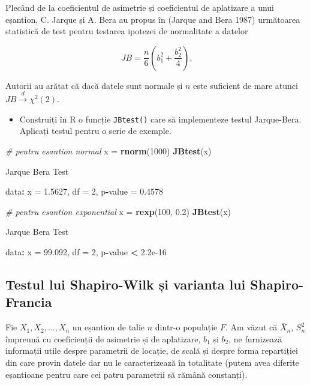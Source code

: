 \documentclass[]{article}
\newenvironment{Shaded}{\begin{snugshade}}{\end{snugshade}}
\newcommand{\KeywordTok}[1]{\textcolor[rgb]{0.13,0.29,0.53}{\textbf{#1}}}
\newcommand{\DecValTok}[1]{\textcolor[rgb]{0.00,0.00,0.81}{#1}}
\newcommand{\FloatTok}[1]{\textcolor[rgb]{0.00,0.00,0.81}{#1}}
\newcommand{\StringTok}[1]{\textcolor[rgb]{0.31,0.60,0.02}{#1}}
\newcommand{\CommentTok}[1]{\textcolor[rgb]{0.56,0.35,0.01}{\textit{#1}}}
\newcommand{\OperatorTok}[1]{\textcolor[rgb]{0.81,0.36,0.00}{\textbf{#1}}}
\newcommand{\NormalTok}[1]{#1}
\newenvironment{frshaded*}{%
  \def\FrameCommand{\fboxrule=\FrameRule\fboxsep=\FrameSep \fcolorbox{framecolor}{shadecolor1}}%
  \MakeFramed {\advance\hsize-\width \FrameRestore}}%
{\endMakeFramed}
\newenvironment{rmdblock}[1]
  {\begin{frshaded*}
  \begin{itemize}
  \renewcommand{\labelitemi}{
    \raisebox{-.7\height}[0pt][0pt]{
      {\setkeys{Gin}{width=2em,keepaspectratio}\texttt{[image: images/icons/\#1]}}
    }
  }
  \item
  }
  {
  \end{itemize}
  \end{frshaded*}
  }
\newenvironment{rmdexercise}
  {\begin{rmdblock}{exercise}}
  {\end{rmdblock}}
\begin{document}
Plecând de la coeficientul de asimetrie și coeficientul de aplatizare a
unui eșantion, C. Jarque și A. Bera au propus în (Jarque and Bera 1987)
următoarea statistică de test pentru testarea ipotezei de normalitate a
datelor

\[
  JB = \frac{n}{6}\left(b_1^2 + \frac{b_2^2}{4}\right).
\]

Autorii au arătat că dacă datele sunt normale și \(n\) este suficient de
mare atunci \(JB\overset{d}{\to}\chi^2(2)\).

\begin{rmdexercise}
Construiți în R o funcție \texttt{JBtest()} care să implementeze testul
Jarque-Bera. Aplicați testul pentru o serie de exemple.
\end{rmdexercise}

\begin{Shaded}
\begin{Highlighting}[]
\CommentTok{# pentru esantion normal }
\NormalTok{x =}\StringTok{ }\KeywordTok{rnorm}\NormalTok{(}\DecValTok{1000}\NormalTok{)}
\KeywordTok{JBtest}\NormalTok{(x)}

\NormalTok{    Jarque Bera Test}

\NormalTok{data}\OperatorTok{:}\StringTok{  }\NormalTok{x}
\NormalTok{=}\StringTok{ }\FloatTok{1.5627}\NormalTok{, df =}\StringTok{ }\DecValTok{2}\NormalTok{, p}\OperatorTok{-}\NormalTok{value =}\StringTok{ }\FloatTok{0.4578}

\CommentTok{# pentru esantion exponential  }
\NormalTok{x =}\StringTok{ }\KeywordTok{rexp}\NormalTok{(}\DecValTok{100}\NormalTok{, }\FloatTok{0.2}\NormalTok{)}
\KeywordTok{JBtest}\NormalTok{(x)}

\NormalTok{    Jarque Bera Test}

\NormalTok{data}\OperatorTok{:}\StringTok{  }\NormalTok{x}
\NormalTok{=}\StringTok{ }\FloatTok{99.092}\NormalTok{, df =}\StringTok{ }\DecValTok{2}\NormalTok{, p}\OperatorTok{-}\NormalTok{value }\OperatorTok{<}\StringTok{ }\FloatTok{2.2e-16}
\end{Highlighting}
\end{Shaded}

\subsection{Testul lui Shapiro-Wilk și varianta lui
Shapiro-Francia}\label{testul-lui-shapiro-wilk-si-varianta-lui-shapiro-francia}

Fie \(X_1, X_2, \ldots, X_n\) un eșantion de talie \(n\) dintr-o
populație \(F\). Am văzut că \(\bar{X}_n\), \(S_n^2\) împreună cu
coeficienții de asimetrie și de aplatizare, \(b_1\) și \(b_2\), ne
furnizează informații utile despre parametrii de locație, de scală și
despre forma repartiției din care provin datele dar nu le caracterizează
în totalitate (putem avea diferite eșantioane pentru care cei patru
parametrii să rămână constanți).
\end{document}
